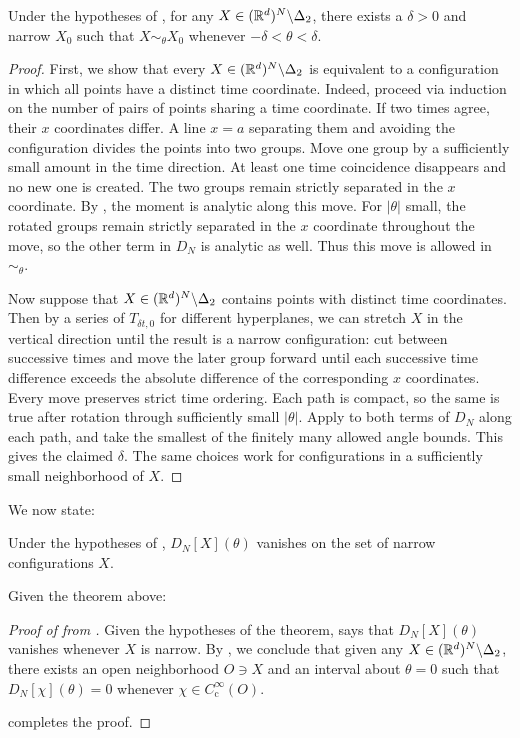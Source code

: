 \begin{proposition}\label{prop:narrowing}
    Under the hypotheses of , for any $X\in (\mathbb{R}^d)^N\backslash \Delta_2$, there exists a $\delta>0$ and narrow $X_0$ such that $X\sim_\theta X_0$ whenever $-\delta<\theta<\delta$. 
\end{proposition}
\begin{proof}
    First, we show that every $X\in (\mathbb{R}^d)^N\backslash \Delta_2$ is equivalent to a configuration in which all points have a distinct time coordinate. Indeed, proceed via induction on the number of pairs of points sharing a time coordinate. If two times agree, their $x$ coordinates differ. A line $x=a$ separating them and avoiding the configuration divides the points into two groups. Move one group by a sufficiently small amount in the time direction. At least one time coincidence disappears and no new one is created. The two groups remain strictly separated in the $x$ coordinate. By , the moment is analytic along this move. For $|\theta|$ small, the rotated groups remain strictly separated in the $x$ coordinate throughout the move, so the other term in $D_N$ is analytic as well. Thus this move is allowed in $\sim_\theta$.

    Now suppose that $X\in (\mathbb{R}^d)^N\backslash \Delta_2$ contains points with distinct time coordinates. Then by a series of $T_{\delta t,0}$ for different hyperplanes, we can stretch $X$ in the vertical direction until the result is a narrow configuration: cut between successive times and move the later group forward until each successive time difference exceeds the absolute difference of the corresponding $x$ coordinates. Every move preserves strict time ordering. Each path is compact, so the same is true after rotation through sufficiently small $|\theta|$. Apply  to both terms of $D_N$ along each path, and take the smallest of the finitely many allowed angle bounds. This gives the claimed $\delta$. The same choices work for configurations in a sufficiently small neighborhood of $X$.
\end{proof}

We now state:
\begin{theorem}\label{thm:weaker}
    Under the hypotheses of , $D_N[X](\theta)$ vanishes on the set of narrow configurations $X$.
\end{theorem}

Given the theorem above:
\begin{proof}[Proof of  from ]
    Given the hypotheses of the theorem,  says that $D_N[X](\theta)$ vanishes whenever $X$ is narrow. By , we conclude that given any $X\in (\mathbb{R}^d)^N\backslash \Delta_2$, there exists an open neighborhood $O\ni X$ and an interval about $\theta=0$ such that $D_N[\chi](\theta)=0$ whenever $\chi\in C_{\mathrm{c}}^\infty(O)$. 

     completes the proof.   
\end{proof}





